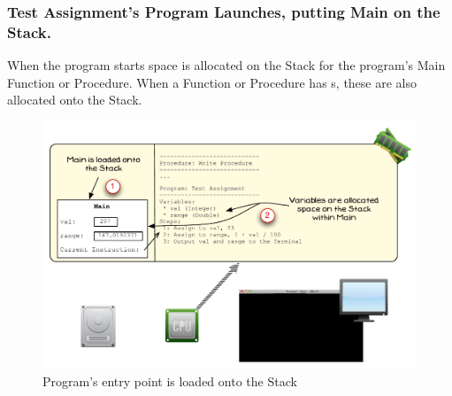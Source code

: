 \clearpage
\subsubsection{Test Assignment's Program Launches, putting Main on the Stack.} %
\label{ssub:test_assignment_s_program_launches_putting_main_on_the_stack_}

When the program starts space is allocated on the Stack for the program's Main Function or Procedure. When a Function or Procedure has s, these are also allocated onto the Stack.

\begin{figure}[htbp]
   \centering
   \includegraphics[width=\textwidth]{./topics/storing-using-data/images/vis-local-var-1} 
   \caption{Program's entry point is loaded onto the Stack}
   \label{fig:vis-data-local-1}
\end{figure}

